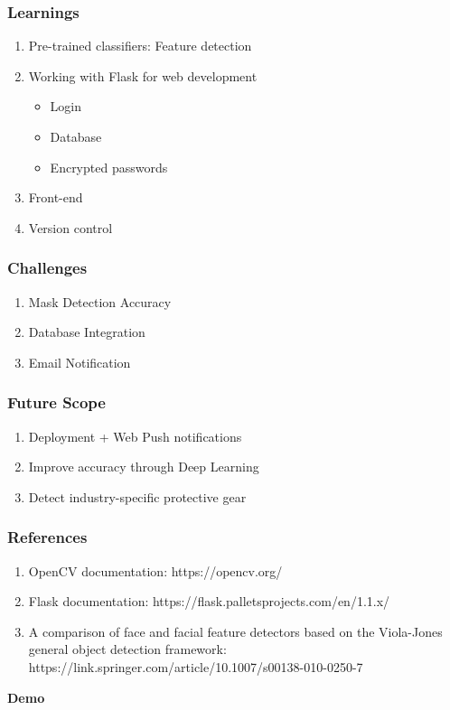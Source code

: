 \documentclass[14pt]{beamer}
\begin{document}
\begin{frame}
    \frametitle{Learnings}
    \begin{enumerate}
        \item Pre-trained classifiers: Feature detection
        \item Working with Flask for web development
        \begin{itemize}
            \item Login 
            \item Database
            \item Encrypted passwords
        \end{itemize}
        \item Front-end
        \item Version control
    \end{enumerate}
\end{frame}

\begin{frame}
    \frametitle{Challenges}
    \begin{enumerate}
        \item Mask Detection Accuracy
        \item Database Integration
        \item Email Notification 
    \end{enumerate}
\end{frame}


\begin{frame}
    \frametitle{Future Scope}
    \begin{enumerate}
        \item Deployment + Web Push notifications
        \item Improve accuracy through Deep Learning
        \item Detect industry-specific protective gear
    \end{enumerate}
\end{frame}

\begin{frame}
    \frametitle{References}
    \begin{enumerate}
        \item OpenCV documentation: 
        https://opencv.org/
        \item Flask documentation: 
        https://flask.palletsprojects.com/en/1.1.x/
        \item A comparison of face and facial feature detectors based on the Viola-Jones general object detection framework: 
        https://link.springer.com/article/10.1007/s00138-010-0250-7
    \end{enumerate}
\end{frame}

\begin{frame}[c]{ }
    \centering
\huge \textbf{Demo}
\end{frame}
\end{document}
